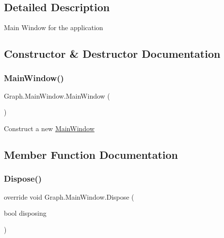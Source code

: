 \subsection{Detailed Description}
Main Window for the application 



\subsection{Constructor \& Destructor Documentation}
\mbox{\label{class_graph_1_1_main_window_a4e5941eebddebf1918da2106ee3d7e22}} 
\subsubsection{\texorpdfstring{Main\+Window()}{MainWindow()}}
{\footnotesize\ttfamily Graph.\+Main\+Window.\+Main\+Window (\begin{DoxyParamCaption}{ }\end{DoxyParamCaption})}



Construct a new \hyperlink{class_graph_1_1_main_window}{Main\+Window} 



\subsection{Member Function Documentation}
\mbox{\label{class_graph_1_1_main_window_a79dbc89bca54467324ea936e580f380e}} 
\subsubsection{\texorpdfstring{Dispose()}{Dispose()}}
{\footnotesize\ttfamily override void Graph.\+Main\+Window.\+Dispose (\begin{DoxyParamCaption}\item[{bool}]{disposing }\end{DoxyParamCaption})\hspace{0.3cm}{\ttfamily [protected]}}



